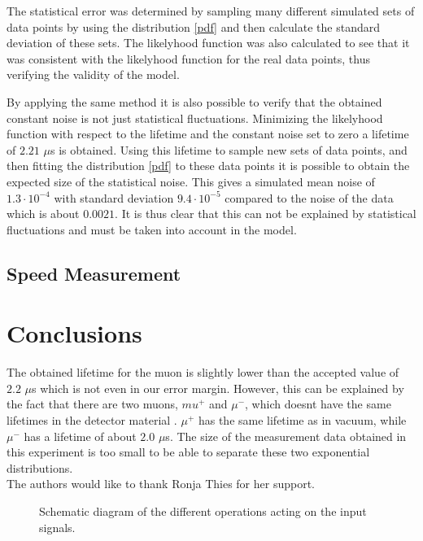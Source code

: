 \documentclass[10pt,twocolumn]{article}
\begin{document}
The statistical error was determined by sampling many different simulated sets of data points by using the distribution \eqref{pdf} and then calculate the standard deviation of these sets. The likelyhood function was also calculated to see that it was consistent with the likelyhood function for the real data points, thus verifying the validity of the model. \newline

By applying the same method it is also possible to verify that the obtained constant noise is not just statistical fluctuations. Minimizing the likelyhood function with respect to the lifetime and the constant noise set to zero a lifetime of $2.21$ $\mu$s is obtained. Using this lifetime to sample new sets of data points, and then fitting the distribution \eqref{pdf} to these data points it is possible to obtain the expected size of the statistical noise. This gives a simulated mean noise of $1.3\cdot 10^{-4}$ with standard deviation $9.4\cdot 10^{-5}$ compared to the noise of the data which is about $0.0021$. It is thus clear that this can not be explained by statistical fluctuations and must be taken into account in the model.

\subsection{Speed Measurement}



\section{Conclusions}
The obtained lifetime for the muon is slightly lower than the accepted value of $2.2$ $\mu$s which is not even in our error margin. However, this can be explained by the fact that there are two muons, $mu^+$ and $\mu^-$, which doesnt have the same lifetimes in the detector material \cite{}. $\mu^+$ has the same lifetime as in vacuum, while $\mu^-$ has a lifetime of about $2.0$ $\mu$s. The size of the measurement data obtained in this experiment is too small to be able to separate these two exponential distributions.\\

The authors would like to thank Ronja Thies for her support.


\begin{figure}[h]

\caption{\label{setup} Schematic diagram of the different operations acting on the input signals.}
\end{figure}
\end{document}
